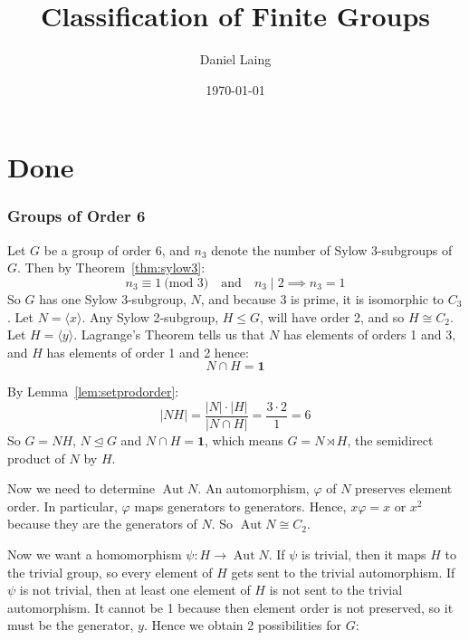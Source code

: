 \documentclass[a4paper, oneside, 12pt, final]{article}
\title{Classification of Finite Groups}
\author{Daniel Laing}
\date{\today}
\theoremstyle{definition}
\DeclareMathOperator{\Aut}{Aut}
\begin{document}
{\maketitle}
{\tableofcontents}

\part{Done}


\section{Groups of Order 6}
Let \(G\) be a group of order 6, and \(n_3\) denote the number of Sylow 3-subgroups of \(G\).
Then by Theorem~\ref{thm:sylow3}:
\[n_3 \equiv 1 \ \text{(mod 3)} \quad \text{and} \quad n_3 \mid 2 \implies n_3 = 1\]
So \(G\) has one Sylow 3-subgroup, \(N\), and because 3 is prime, it is isomorphic to \(C_3\).
Let \(N = \langle x \rangle\).
Any Sylow 2-subgroup, \(H \leqslant G\), will have order 2, and so \(H \cong C_2\).
Let \(H = \langle y \rangle\).
Lagrange's Theorem tells us that \(N\) has elements of orders 1 and 3, and \(H\) has elements of
order 1 and 2 hence:
\[N \cap H = \bm{1}\]

By Lemma~\ref{lem:setprodorder}:
\[|NH| = \frac{|N| \cdot |H|}{|N \cap H|} = \frac{3 \cdot 2}{1} = 6\]
So \(G = NH\), \(N \unlhd G\) and \(N \cap H = \bm{1}\), which means \(G = N \rtimes H\), the
semidirect product of \(N\) by \(H\).

Now we need to determine \(\Aut{N}\).
An automorphism, \(\varphi\) of \(N\) preserves element order.
In particular, \(\varphi\) maps generators to generators.
Hence, \(x\varphi = x\) or \(x^2\) because they are the generators of \(N\).
So \(\Aut{N} \cong C_2\).

Now we want a homomorphism \(\psi:H \to \Aut{N}\).
If \(\psi\) is trivial, then it maps \(H\) to the trivial group, so every element of \(H\) gets sent
to the trivial automorphism.
If \(\psi\) is not trivial, then at least one element of \(H\) is not sent to the trivial
automorphism.
It cannot be 1 because then element order is not preserved, so it must be the generator, \(y\).
Hence we obtain 2 possibilities for \(G\):
\end{document}
